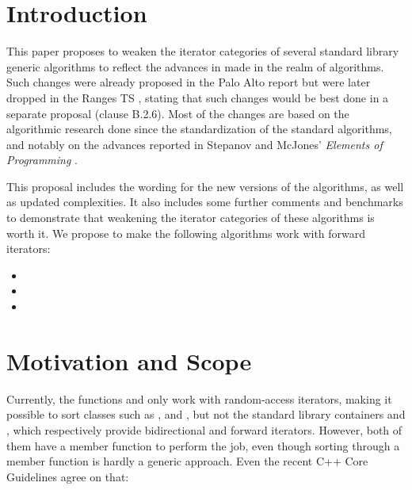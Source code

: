 \documentclass{isocpp_proposal}
\date{\today}
\begin{document}
\maketitle

\section{Introduction}

This paper proposes to weaken the iterator categories of several standard library generic algorithms to reflect the advances in made in the realm of algorithms. Such changes were already proposed in the Palo Alto report \cite{N3351} but were later dropped in the Ranges TS \cite{N4560}, stating that such changes would be best done in a separate proposal (clause B.2.6). Most of the changes are based on the algorithmic research done since the standardization of the standard algorithms, and notably on the advances reported in Stepanov and McJones' \emph{Elements of Programming} \cite{EOP}.

\vspace{0.3cm}

This proposal includes the wording for the new versions of the algorithms, as well as updated complexities. It also includes some further comments and benchmarks to demonstrate that weakening the iterator categories of these algorithms is worth it. We propose to make the following algorithms work with forward iterators:

\begin{itemize}
\item {}
\item {}
\item {}
\end{itemize}

\section{Motivation and Scope}

Currently, the functions  and  only work with random-access iterators, making it possible to sort classes such as ,  and , but not the standard library containers  and , which respectively provide bidirectional and forward iterators. However, both of them have a member function  to perform the job, even though sorting through a member function is hardly a generic approach. Even the recent C++ Core Guidelines \cite{CppCoreGuidelines} agree on that:
\end{document}
